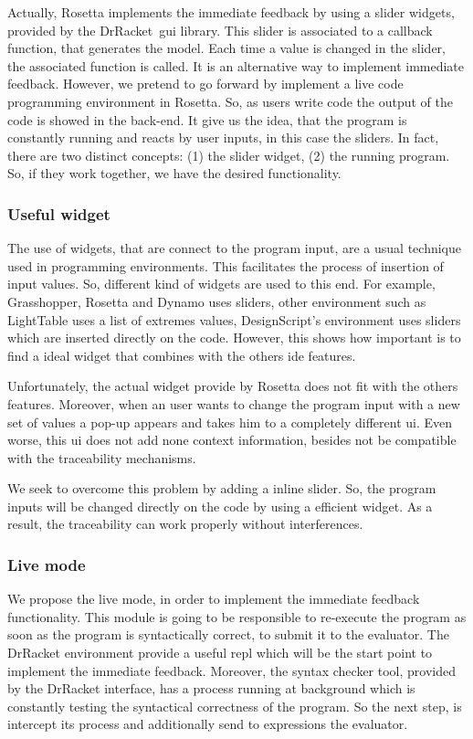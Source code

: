 Actually, Rosetta implements the immediate feedback by using a slider widgets, provided by the DrRacket~\ac{gui} library. This slider is associated to a callback function, that generates the model. Each time a value is changed in the slider, the associated function is called. It is an alternative way to implement immediate feedback. However, we pretend to go forward by implement a live code programming environment in Rosetta. So, as users write code the output of the code is showed in the back-end. It give us the idea, that the program is constantly running and reacts by user inputs, in this case the sliders. In fact, there are two distinct concepts: (1) the slider widget, (2) the running program. So, if they work together, we have the desired functionality.

\subsubsection{Useful widget}

The use of widgets, that are connect to the program input, are a usual technique used in programming environments. This facilitates the process of insertion of input values. So, different kind of widgets are used to this end. For example, Grasshopper, Rosetta and Dynamo uses sliders, other environment such as LightTable uses a list of extremes values, DesignScript's environment uses sliders which are inserted directly on the code. However, this shows how important is to find a ideal widget that combines with the others \ac{ide} features.

Unfortunately, the actual widget provide by Rosetta does not fit with the others features. Moreover, when an user wants to change the program input with a new set of values a pop-up appears and takes him to a completely different \ac{ui}. Even worse, this \ac{ui} does not add none context information, besides not be compatible with the traceability mechanisms.

We seek to overcome this problem by adding a inline slider. So, the program inputs will be changed directly on the code by using a efficient widget. As a result, the traceability can work properly without interferences.

\subsubsection{Live mode}

We propose the live mode, in order to implement the immediate feedback functionality. This module is going to be responsible to re-execute the program as soon as the program is syntactically correct, to submit it to the evaluator. The DrRacket environment provide a useful \ac{repl} which will be the start point to implement the immediate feedback. Moreover, the syntax checker tool, provided by the DrRacket interface, has a process running at background which is constantly testing the syntactical correctness of the program. So the next step, is intercept its process and additionally send to expressions the evaluator. 

